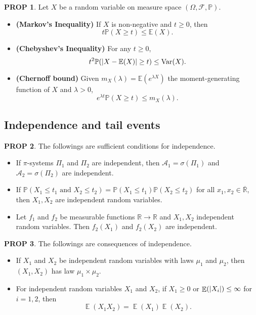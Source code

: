 \documentclass[hidelinks,11pt]{article}
\theoremstyle{definition}
\theoremstyle{dotless}
\newtheorem{prop}{PROP}[section]
\theoremstyle{remark}
\DeclareMathOperator{\Var}{Var}
\DeclareMathOperator{\E}{\mathbb{E}}
\DeclareMathOperator{\1}{\mathbf{1}}
\begin{document}
\begin{prop}
Let $X$ be a random variable on measure space $(\Omega,\mathcal{F},\mathbb{P})$.
\begin{itemize}
    \item \textup{\textbf{(Markov's Inequality)}} If $X$ is non-negative and $t\geq0$, then
    \[t\mathbb{P}(X\geq t)\leq\mathbb{E}(X).\]
    \item \textup{\textbf{(Chebyshev's Inequality)}} For any $t\geq0$,
    \[t^2\mathbb{P}(\abs{X-\mathbb{E}(X)}\geq t)\leq\Var(X).\]
    \item \textup{\textbf{(Chernoff bound)}} Given $m_X(\lambda)=\mathbb{E}(e^{\lambda X})$ the moment-generating function of $X$ and $\lambda>0$,
    \[e^{\lambda t}\mathbb{P}(X\geq t)\leq m_X(\lambda).\]
\end{itemize}
\end{prop}

\subsection{Independence and tail events}

\begin{prop}The followings are sufficient conditions for independence.\begin{itemize}
    \item If $\pi$-systems $\Pi_1$ and $\Pi_2$ are  independent, then $\mathcal{A}_1=\sigma(\Pi_1)$ and $\mathcal{A}_2=\sigma(\Pi_2)$ are independent.
    \item If $\mathbb{P}(X_1\leq t_1\textrm{ and }X_2\leq t_2)=\mathbb{P}(X_1\leq t_1)\mathbb{P}(X_2\leq t_2)$ for all $x_1,x_2\in\overline{\mathbb{R}}$, then $X_1,X_2$ are independent random variables.
    \item Let $f_1$ and $f_2$ be measurable functions $\mathbb{R}\to\mathbb{R}$ and $X_1,X_2$ independent random variables. Then $f_2(X_1)$ and $f_2(X_2)$ are independent.
\end{itemize}
\end{prop}

\begin{prop}
The followings are consequences of independence.\begin{itemize}
    \item If $X_1$ and $X_2$ be independent random variables with laws $\mu_1$ and $\mu_2$, then $(X_1,X_2)$ has law $\mu_1\times\mu_2$.
    \item For independent random variables $X_1$ and $X_2$, if $X_1\geq0$ or $\E(\abs{X_i})\leq\infty$ for $i=1,2$, then
    \[\E(X_1X_2)=\E(X_1)\E(X_2).\]
\end{itemize}
\end{prop}
\end{document}
